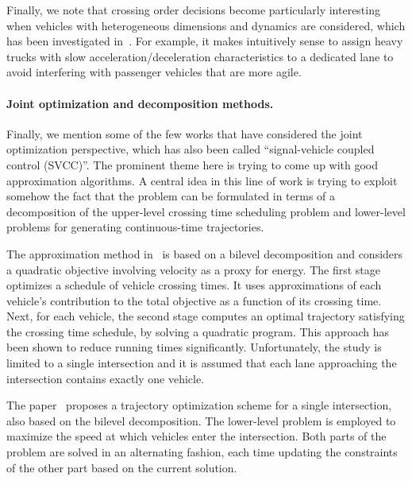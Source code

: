 \documentclass[a4paper]{report}
\theoremstyle{definition}
\theoremstyle{plain}
\begin{document}
Finally, we note that crossing order decisions become particularly interesting
when vehicles with heterogeneous dimensions and dynamics are considered, which
has been investigated in~\cite{joshiTrajectoriesPlatoonformingAlgorithm2025}.
For example, it makes intuitively sense to assign heavy trucks with slow
acceleration/deceleration characteristics to a dedicated lane to avoid
interfering with passenger vehicles that are more agile.

\paragraph{Joint optimization and decomposition methods.}

Finally, we mention some of the few works that have considered the joint
optimization perspective, which has also been called ``signal-vehicle coupled
control (SVCC)''. The prominent theme here is trying to come up with good
approximation algorithms. A central idea in this line of work is trying to
exploit somehow the fact that the problem can be formulated in terms of a
decomposition of the upper-level crossing time scheduling problem and
lower-level problems for generating continuous-time trajectories.

The approximation method in~\cite{hultApproximateSolutionOptimal2015} is based
on a bilevel decomposition and considers a quadratic objective involving
velocity as a proxy for energy. The first stage optimizes a schedule of vehicle
crossing times. It uses approximations of each vehicle's contribution to the
total objective as a function of its crossing time. Next, for each vehicle, the
second stage computes an optimal trajectory satisfying the crossing time
schedule, by solving a quadratic program. This approach has been shown to reduce
running times significantly. Unfortunately, the study is limited to a single
intersection and it is assumed that each lane approaching the intersection
contains exactly one vehicle.

The paper~\cite{zhaoBilevelProgrammingModel2021} proposes a trajectory
optimization scheme for a single intersection, also based on the bilevel
decomposition. The lower-level problem is employed to maximize the speed at
which vehicles enter the intersection. Both parts of the problem are solved in an alternating
fashion, each time updating the constraints of the other part based on the
current solution.
\end{document}
